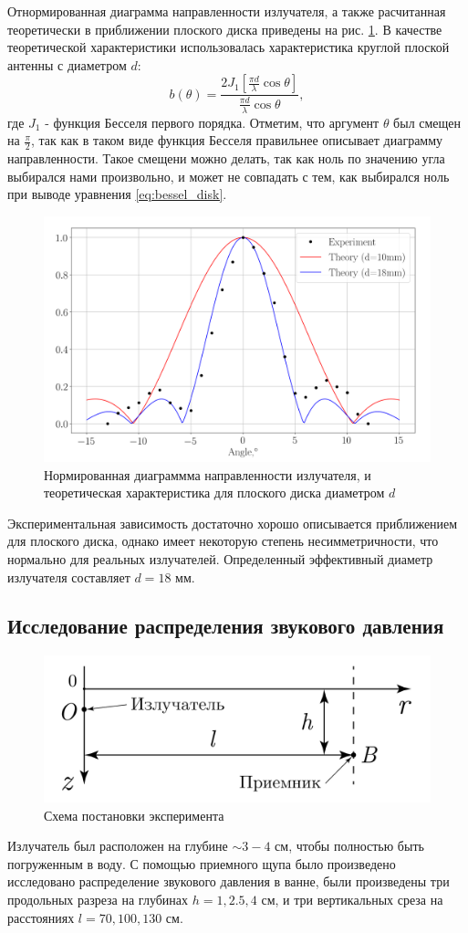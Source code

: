 Отнормированная диаграмма направленности излучателя, а также расчитанная теоретически в приближении плоского диска
приведены на рис. \ref{fig:direct}. В качестве теоретической характеристики использовалась характеристика круглой
плоской антенны с диаметром $d$:
\begin{equation}
	b(\theta) = \frac{2 J_1[ \frac{\pi d}{\lambda} \cos \theta ]}{\frac{\pi d}{\lambda} \cos \theta },
	\label{eq:bessel_disk}
\end{equation}
где $J_1$ - функция Бесселя первого порядка. Отметим, что аргумент $\theta$ был смещен на $\frac{\pi}{2}$, так как в
таком виде функция Бесселя правильнее описывает диаграмму направленности. Такое смещени можно делать, так как ноль по
значению угла выбирался нами произвольно, и может не совпадать с тем, как выбирался ноль при выводе уравнения \eqref{eq:bessel_disk}. 
\begin{figure}[h!]
	\centering
	\includegraphics[width=0.9\linewidth]{fig/direct.png}
	\caption{Нормированная диаграммма направленности излучателя, и теоретическая характеристика для плоского диска диаметром $d$}
	\label{fig:direct}
\end{figure}

Экспериментальная зависимость достаточно хорошо описывается приближением для плоского диска, однако имеет некоторую
степень несимметричности, что нормально для реальных излучателей.
Определенный эффективный диаметр излучателя составляет $d = 18$ мм.
\subsection{Исследование распределения звукового давления}
\begin{figure}[h!]
	\centering
	\includegraphics[width =0.5\linewidth]{fig/scheme3.pdf}
	\caption{Схема постановки эксперимента}
	\label{fig:expt:scheme3}
\end{figure}
Излучатель был расположен на глубине $\sim 3-4$ см, чтобы полностью быть погруженным в воду.
С помощью приемного щупа было произведено исследовано распределение звукового давления в ванне, были произведены три
продольных разреза на глубинах $h = 1,2.5,4$ см, и три вертикальных среза на расстояниях $l=70,100,130$ см.

